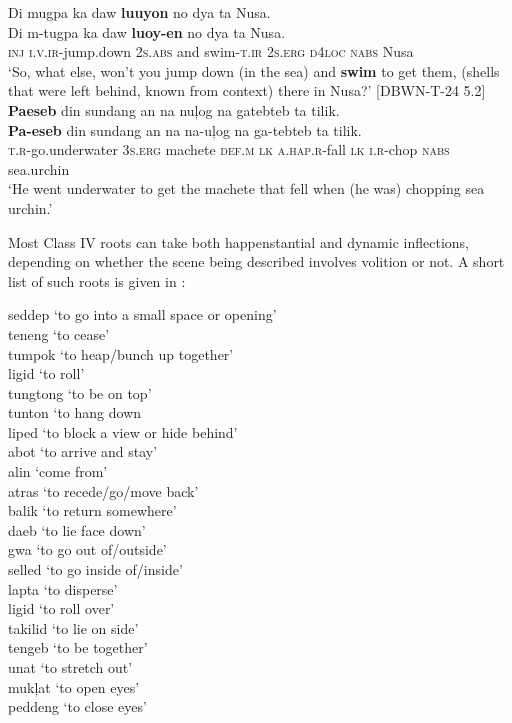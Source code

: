 \ea
Di  mugpa  ka  daw  \textbf{luuyon}  no  dya  ta  Nusa. \\\smallskip
\gll Di  m-tugpa  ka  daw  \textbf{luoy-en}  no  dya  ta  Nusa. \\
\textsc{inj}  \textsc{i.v.ir}-jump.down  2\textsc{s.abs}  and  swim-\textsc{t.ir}  2\textsc{s.erg}  \textsc{d4loc}  \textsc{nabs}  Nusa \\
\glt `So, what else, won’t you jump down (in the sea) and \textbf{swim} to get them, (shells that were left behind, known from context) there in Nusa?’ [DBWN-T-24 5.2] 
\z
\ea
\textbf{Paeseb}  din  sundang  an  na  nuļog na  gatebteb  ta  tilik. \\\smallskip
\gll \textbf{Pa-eseb}  din  sundang  an  na  na-uļog na  ga-tebteb  ta  tilik. \\
\textsc{t.r}-go.underwater  3\textsc{s.erg}  machete  \textsc{def.m}  \textsc{lk}  \textsc{a.hap.r}-fall \textsc{lk}  \textsc{i.r}-chop  \textsc{nabs}  sea.urchin \\
\glt ‘He went underwater to get the machete that fell when (he was) chopping sea urchin.’ 
\z

Most Class IV roots can take both happenstantial and dynamic inflections, depending on whether the scene being described involves volition or not. A short list of such roots is given in :

\ea 
\label{bkm:Ref148949595}
\begin{multicols}{2} seddep  ‘to go into a small space or opening’ \\
  teneng ‘to cease’ \\
  tumpok ‘to heap/bunch up together’ \\
  ligid  ‘to roll’ \\
  tungtong  ‘to be on top’ \\
  tunton  ‘to hang down \\
  liped ‘to block a view or hide behind’ \\
  abot ‘to arrive and stay’ \\
  alin ‘come from’ \\
  atras  ‘to recede/go/move back’ \\
  balik  ‘to return somewhere’ \\
  daeb ‘to lie face down’ \\
  gwa ‘to go out of/outside’ \\
  selled ‘to go inside of/inside’ \\
  lapta ‘to disperse’ \\
  ligid ‘to roll over’ \\
  takilid ‘to lie on side’ \\
  tengeb ‘to be together’ \\
  unat ‘to stretch out’ \\
  mukļat ‘to open eyes’ \\
  peddeng ‘to close eyes’
\end{multicols}
\z

